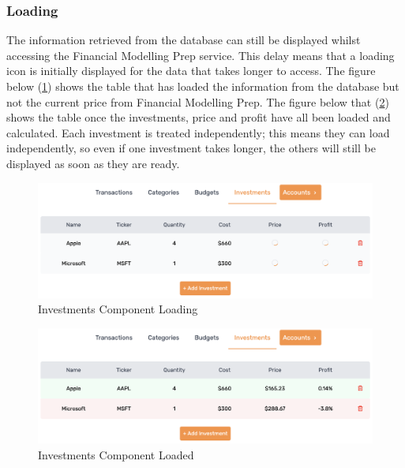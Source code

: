 \subsubsection{Loading}
The information retrieved from the database can still be displayed whilst accessing the Financial Modelling Prep service. This delay means that a loading icon is initially displayed for the data that takes longer to access. The figure below (\ref{fig:InvestmentsLoading}) shows the table that has loaded the information from the database but not the current price from Financial Modelling Prep. The figure below that (\ref{fig:InvestmentsLoaded}) shows the table once the investments, price and profit have all been loaded and calculated. Each investment is treated independently; this means they can load independently, so even if one investment takes longer, the others will still be displayed as soon as they are ready.

\begin{figure}[H]
	\centering
	\includegraphics[width=\textwidth]{images/investments_loading.png}
	\caption{Investments Component Loading}
	\label{fig:InvestmentsLoading}
\end{figure}

\begin{figure}[H]
	\centering
	\includegraphics[width=\textwidth]{images/investments_loaded.png}
	\caption{Investments Component Loaded}
	\label{fig:InvestmentsLoaded}
\end{figure}

